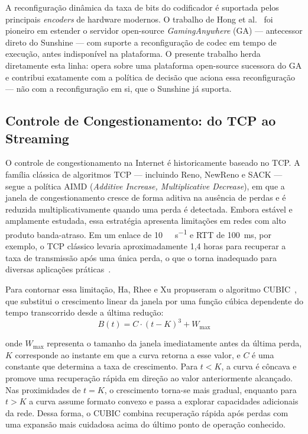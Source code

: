 A reconfiguração dinâmica da taxa de bits do codificador é
suportada pelos principais \emph{encoders} de hardware modernos. O trabalho de Hong et al.~\cite{hong2015}
foi pioneiro em estender o servidor open-source
\emph{GamingAnywhere} (GA) — antecessor direto do Sunshine — com
suporte a reconfiguração de codec em tempo de execução, antes
indisponível na plataforma. O presente trabalho herda
diretamente esta linha: opera sobre uma plataforma open-source
sucessora do GA e contribui exatamente com a política de decisão
que aciona essa reconfiguração — não com a reconfiguração em si,
que o Sunshine já suporta.

\subsection{Controle de Congestionamento: do TCP ao Streaming}

O controle de congestionamento na Internet é historicamente baseado no TCP. A família clássica de algoritmos TCP --- incluindo Reno, NewReno e SACK --- segue a política AIMD (\emph{Additive Increase, Multiplicative Decrease}), em que a janela de congestionamento cresce de forma aditiva na ausência de perdas e é reduzida multiplicativamente quando uma perda é detectada. Embora estável e amplamente estudada, essa estratégia apresenta limitações em redes com alto produto banda-atraso. Em um enlace de \SI{10}{\giga\bit\per\second} e RTT de \SI{100}{\milli\second}, por exemplo, o TCP clássico levaria aproximadamente 1,4 horas para recuperar a taxa de transmissão após uma única perda, o que o torna inadequado para diversas aplicações práticas~\cite{cubic}.

Para contornar essa limitação, Ha, Rhee e Xu propuseram o algoritmo CUBIC~\cite{cubic}, que substitui o crescimento linear da janela por uma função cúbica dependente do tempo transcorrido desde a última redução:
\begin{equation}
B(t) = C \cdot (t - K)^3 + W_{\max}
\label{eq:cubic}
\end{equation}

onde $W_{\max}$ representa o tamanho da janela imediatamente antes da última perda, $K$ corresponde ao instante em que a curva retorna a esse valor, e $C$ é uma constante que determina a taxa de crescimento. Para $t < K$, a curva é côncava e promove uma recuperação rápida em direção ao valor anteriormente alcançado. Nas proximidades de $t = K$, o crescimento torna-se mais gradual, enquanto para $t > K$ a curva assume formato convexo e passa a explorar capacidades adicionais da rede. Dessa forma, o CUBIC combina recuperação rápida após perdas com uma expansão mais cuidadosa acima do último ponto de operação conhecido.

